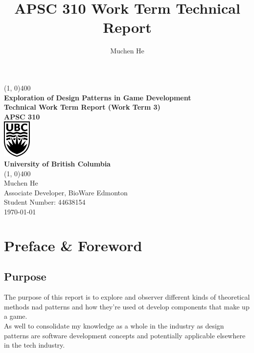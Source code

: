 \documentclass[10pt,letterpaper]{article}
\author{Muchen He}
\title{APSC 310 Work Term Technical Report}
\newcommand{\bs}{\bigskip}
\newcommand{\titletext}{Exploration of Design Patterns in Game Development}
\begin{document}
\begin{titlepage}
	\begin{center}
		\vspace*{2in}
		\line(1, 0){400}\\
		\Huge{\textbf{\titletext{}}}\\[0.2cm]
		\large{\textbf{Technical Work Term Report (Work Term 3)}}\\[1cm]
		\Large{\textbf{APSC 310}}\\[1cm]
		\includegraphics[width=1.4cm]{assets/ubc}\\
		\textbf{University of British Columbia}\\
		\line(1, 0){400}\\
		\vfill
		\Large{Muchen He}\\
		\large{Associate Developer, BioWare Edmonton}\\
		Student Number: 44638154\\

		\today \\
	\end{center}
\end{titlepage}

\setcounter{secnumdepth}{3}
\tableofcontents
\thispagestyle{empty}
\clearpage



\section*{Preface \& Foreword}

\subsection*{Purpose}

The purpose of this report is to explore and observer different kinds of theoretical methods nad patterns and how they're used ot develop components that make up a game.\bs
\\
As well to consolidate my knowledge as a whole in the industry as design patterns are software development concepts and potentially applicable elsewhere in the tech industry.
\end{document}
